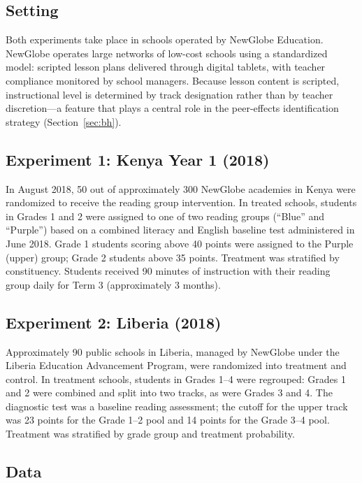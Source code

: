 \documentclass[11pt]{article}
\begin{document}
\subsection{Setting}

Both experiments take place in schools operated by NewGlobe Education. NewGlobe operates large networks of low-cost schools using a standardized model: scripted lesson plans delivered through digital tablets, with teacher compliance monitored by school managers. Because lesson content is scripted, instructional level is determined by track designation rather than by teacher discretion---a feature that plays a central role in the peer-effects identification strategy (Section~\ref{sec:bh}).

\subsection{Experiment 1: Kenya Year 1 (2018)}

In August 2018, 50 out of approximately 300 NewGlobe academies in Kenya were randomized to receive the reading group intervention. In treated schools, students in Grades 1 and 2 were assigned to one of two reading groups (``Blue'' and ``Purple'') based on a combined literacy and English baseline test administered in June 2018. Grade 1 students scoring above 40 points were assigned to the Purple (upper) group; Grade 2 students above 35 points. Treatment was stratified by constituency. Students received 90 minutes of instruction with their reading group daily for Term 3 (approximately 3 months).

\subsection{Experiment 2: Liberia (2018)}

Approximately 90 public schools in Liberia, managed by NewGlobe under the Liberia Education Advancement Program, were randomized into treatment and control. In treatment schools, students in Grades 1--4 were regrouped: Grades 1 and 2 were combined and split into two tracks, as were Grades 3 and 4. The diagnostic test was a baseline reading assessment; the cutoff for the upper track was 23 points for the Grade 1--2 pool and 14 points for the Grade 3--4 pool. Treatment was stratified by grade group and treatment probability.

\subsection{Data}
\end{document}
